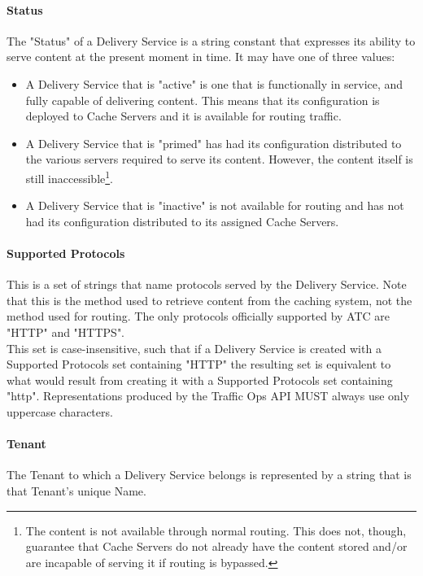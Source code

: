 \paragraph{Status}
The "Status" of a Delivery Service is a string constant that expresses its
ability to serve content at the present moment in time. It may have one of three
values:

\begin{itemize}
	\item {} A Delivery Service that is "active" is one that is
	functionally in service, and fully capable of delivering content. This means
	that its configuration is deployed to Cache Servers and it is available for
	routing traffic.
	\item {} A Delivery Service that is "primed" has had its
	configuration distributed to the various servers required to serve its
	content. However, the content itself is still inaccessible\footnote{The
	content is not available through normal routing. This does not, though,
	guarantee that Cache Servers do not already have the content stored and/or
	are incapable of serving it if routing is bypassed.}.
	\item {} A Delivery Service that is "inactive" is not available
	for routing and has not had its configuration distributed to its assigned
	Cache Servers.
\end{itemize}

\paragraph{Supported Protocols}
This is a set of strings that name protocols served by the Delivery Service.
Note that this is the method used to retrieve content from the caching system,
not the method used for routing. The only protocols officially supported by ATC
are "HTTP" and "HTTPS".\\
This set is case-insensitive, such that if a Delivery Service is created with a
Supported Protocols set containing "HTTP" the resulting set is equivalent to
what would result from creating it with a Supported Protocols set containing
"http". Representations produced by the Traffic Ops API MUST always use
only uppercase characters.

\paragraph{Tenant}
The Tenant to which a Delivery Service belongs is represented by a string that
is that Tenant's unique Name.

